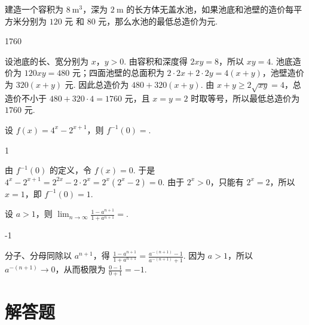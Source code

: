 \documentclass[UTF8,a4paper,oneside,11pt]{ctexbook}
\begin{document}
\begin{problem}
建造一个容积为 \(8\mathrm{~m}^{3}\)，深为 \(2\mathrm{~m}\) 的长方体无盖水池，如果池底和池壁的造价每平方米分别为 \(120\text{ 元}\) 和 \(80\text{ 元}\)，那么水池的最低总造价为\fillinblank{}\(\text{元}\).
\end{problem}

\begin{answer}
1760
\end{answer}

\begin{solution}
设池底的长、宽分别为 \(x\)，\(y>0\). 由容积和深度得 \(2xy=8\)，所以 \(xy=4\). 池底造价为 \(120xy=480\) 元；四面池壁的总面积为 \(2\cdot2x+2\cdot2y=4(x+y)\)，池壁造价为 \(320(x+y)\) 元. 因此总造价为 \(480+320(x+y)\). 由 \(x+y\geqslant2\sqrt{xy}=4\)，总造价不小于 \(480+320\cdot4=1760\) 元，且 \(x=y=2\) 时取等号，所以最低总造价为 \(1760\) 元.
\end{solution}

\begin{problem}
设 \(f(x) = 4^{x} - 2^{x + 1}\)，则 \(f^{-1}(0) =\)\fillinblank{}.
\end{problem}

\begin{answer}
1
\end{answer}

\begin{solution}
由 \(f^{-1}(0)\) 的定义，令 \(f(x)=0\). 于是 \(\displaystyle4^x-2^{x+1}=2^{2x}-2\cdot2^x=2^x(2^x-2)=0\). 由于 \(2^x>0\)，只能有 \(2^x=2\)，所以 \(x=1\)，即 \(f^{-1}(0)=1\).
\end{solution}

\begin{problem}
设 \(a > 1\)，则 \(\displaystyle\lim_{n \to \infty} \frac{1 - a^{n + 1}}{1 + a^{n + 1}} =\)\fillinblank{}.
\end{problem}

\begin{answer}
-1
\end{answer}

\begin{solution}
分子、分母同除以 \(a^{n+1}\)，得 \(\displaystyle\frac{1-a^{n+1}}{1+a^{n+1}}=\frac{a^{-(n+1)}-1}{a^{-(n+1)}+1}\). 因为 \(a>1\)，所以 \(a^{-(n+1)}\to0\)，从而极限为 \(\displaystyle\frac{0-1}{0+1}=-1\).
\end{solution}

\section{解答题}
\end{document}
